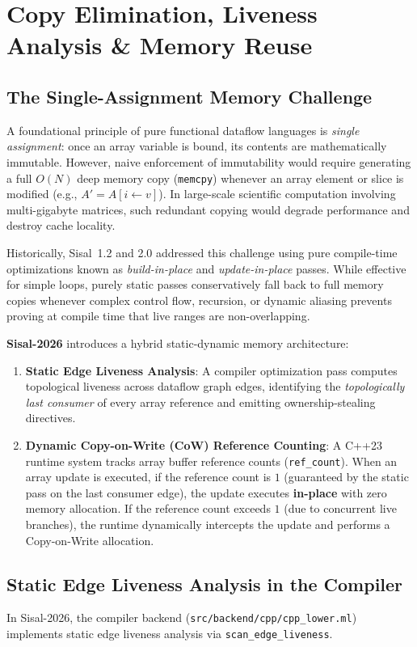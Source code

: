 \chapter{Copy Elimination, Liveness Analysis \& Memory Reuse}
\label{chap:copy_enforcement}

\section{The Single-Assignment Memory Challenge}
A foundational principle of pure functional dataflow languages is \emph{single assignment}: once an array variable is bound, its contents are mathematically immutable. However, naive enforcement of immutability would require generating a full $O(N)$ deep memory copy (\texttt{memcpy}) whenever an array element or slice is modified (e.g., $A' = A[i \gets v]$). In large-scale scientific computation involving multi-gigabyte matrices, such redundant copying would degrade performance and destroy cache locality.

Historically, Sisal~1.2 and 2.0 addressed this challenge using pure compile-time optimizations known as \emph{build-in-place} and \emph{update-in-place} passes. While effective for simple loops, purely static passes conservatively fall back to full memory copies whenever complex control flow, recursion, or dynamic aliasing prevents proving at compile time that live ranges are non-overlapping.

\textbf{Sisal-2026} introduces a hybrid static-dynamic memory architecture:
\begin{enumerate}
    \item \textbf{Static Edge Liveness Analysis}: A compiler optimization pass computes topological liveness across dataflow graph edges, identifying the \emph{topologically last consumer} of every array reference and emitting ownership-stealing directives.
    \item \textbf{Dynamic Copy-on-Write (CoW) Reference Counting}: A C++23 runtime system tracks array buffer reference counts (\texttt{ref\_count}). When an array update is executed, if the reference count is $1$ (guaranteed by the static pass on the last consumer edge), the update executes \textbf{in-place} with zero memory allocation. If the reference count exceeds $1$ (due to concurrent live branches), the runtime dynamically intercepts the update and performs a Copy-on-Write allocation.
\end{enumerate}

\section{Static Edge Liveness Analysis in the Compiler}
In Sisal-2026, the compiler backend (\texttt{src/backend/cpp/cpp\_lower.ml}) implements static edge liveness analysis via \texttt{scan\_edge\_liveness}. 

